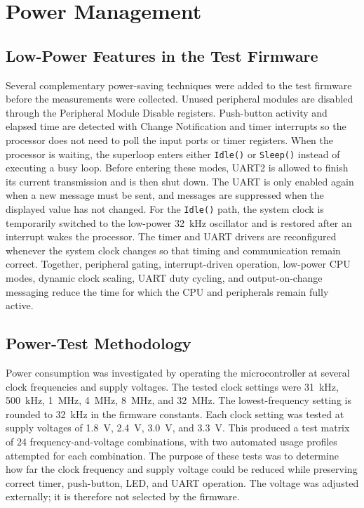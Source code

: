 \documentclass[11pt]{article}
\newcommand{\code}[1]{\texttt{#1}}
\begin{document}
\section{Power Management}

\subsection{Low-Power Features in the Test Firmware}

Several complementary power-saving techniques were added to the test firmware before the measurements were collected. Unused peripheral modules are disabled through the Peripheral Module Disable registers. Push-button activity and elapsed time are detected with Change Notification and timer interrupts so the processor does not need to poll the input ports or timer registers. When the processor is waiting, the superloop enters either \code{Idle()} or \code{Sleep()} instead of executing a busy loop. Before entering these modes, UART2 is allowed to finish its current transmission and is then shut down. The UART is only enabled again when a new message must be sent, and messages are suppressed when the displayed value has not changed. For the \code{Idle()} path, the system clock is temporarily switched to the low-power 32~kHz oscillator and is restored after an interrupt wakes the processor. The timer and UART drivers are reconfigured whenever the system clock changes so that timing and communication remain correct. Together, peripheral gating, interrupt-driven operation, low-power CPU modes, dynamic clock scaling, UART duty cycling, and output-on-change messaging reduce the time for which the CPU and peripherals remain fully active.

\subsection{Power-Test Methodology}

Power consumption was investigated by operating the microcontroller at several clock frequencies and supply voltages. The tested clock settings were 31~kHz, 500~kHz, 1~MHz, 4~MHz, 8~MHz, and 32~MHz. The lowest-frequency setting is rounded to 32~kHz in the firmware constants. Each clock setting was tested at supply voltages of 1.8~V, 2.4~V, 3.0~V, and 3.3~V. This produced a test matrix of 24 frequency-and-voltage combinations, with two automated usage profiles attempted for each combination. The purpose of these tests was to determine how far the clock frequency and supply voltage could be reduced while preserving correct timer, push-button, LED, and UART operation. The voltage was adjusted externally; it is therefore not selected by the firmware.
\end{document}
